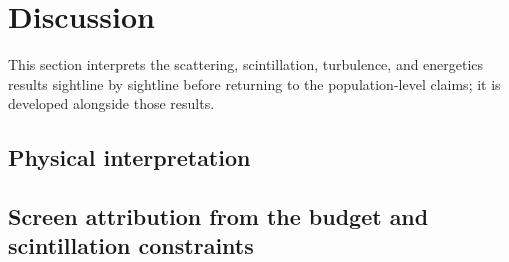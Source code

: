 \section{Discussion}
\label{sec:discussion}

This section interprets the scattering, scintillation, turbulence, and
energetics results sightline by sightline before returning to the
population-level claims; it is developed alongside those results.

\subsection{Physical interpretation}
\label{sec:disc-interpretation}

%

\subsection{Screen attribution from the budget and scintillation constraints}
\label{sec:disc-screen-attribution}

